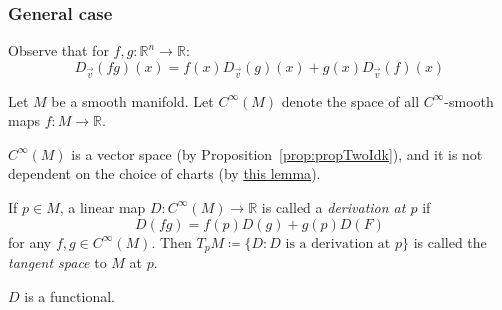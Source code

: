 \subsubsection*{General case}
Observe that for $f, g : \mathbb{R}^n \to \mathbb{R}$:
\[ 
    D_{\vec{v}} (fg)(x) = f(x) D_{\vec{v}}(g)(x) + 
    g(x) D_{\vec{v}}(f)(x) 
\]
\begin{definition}
    Let $M$ be a smooth manifold. 
    Let $C^\infty(M)$ denote the space of all $C^\infty$-smooth maps 
    $f: M \to \mathbb{R}$.
\end{definition}
\begin{remark}
    $C^\infty(M)$ is a vector space (by Proposition~\ref{prop:propTwoIdk}),
    and it is not dependent on the choice of charts
    (by \hyperref[lem:independentOfChartChoice]{this lemma}).
\end{remark}
\begin{definition}
    If $p \in M$, a linear map $D : C^\infty(M) \to \mathbb{R}$ is called a
    \textit{derivation at $p$} if 
    \[ D(fg) = f(p) D(g) + g(p) D(F) \]
    for any $f, g \in C^\infty(M)$.
    Then $T_p M \coloneqq \{D : D \text{ is a derivation at } p \}$
    is called the \textit{tangent space} to $M$ at $p$.
\end{definition}
\begin{remark}
    $D$ is a functional.
\end{remark}
